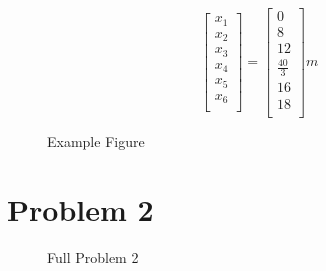 \documentclass[8pt]{article}
\begin{document}
\begin{figure}[h!]
    \begin{minipage}{0.3\textwidth}
        \centering
        \[
        \begin{bmatrix}
            x_1 \\
            x_2 \\
            x_3 \\
            x_4 \\
            x_5 \\
            x_6 \\
        \end{bmatrix}
        =
        \begin{bmatrix}
            0 \\
            8 \\
            12 \\
            \frac{40}{3} \\
            16 \\
            18 \\
        \end{bmatrix}
        m
        \]
        \end{minipage}\hfill
        \begin{minipage}{0.6\textwidth}
            \centering
            \caption{Example Figure}
        \end{minipage}
\end{figure}

\section{Problem 2}

\begin{figure}[h!]
    \centering
    \caption{Full Problem 2}
\end{figure}
\end{document}
